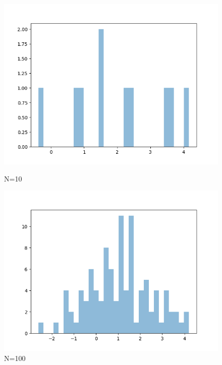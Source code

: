 \documentclass{article}
\begin{document}
\begin{multicols}{2}
    
    \begin{figure}[H]
        \centering
        \begin{minipage}{0.49\textwidth}
            \centering
            \includegraphics[width=\textwidth]{figures/1.2/dataset_1.png}
            \caption{N=10}
        \end{minipage}
        \hfill
        \begin{minipage}{0.49\textwidth}
            \centering
            \includegraphics[width=\textwidth]{figures/1.2/dataset_2.png}
            \caption{N=100}
        \end{minipage}
        \hfill
        \begin{minipage}{0.49\textwidth}
            \centering

\end{minipage}
\end{figure}
\end{multicols}
\end{document}
